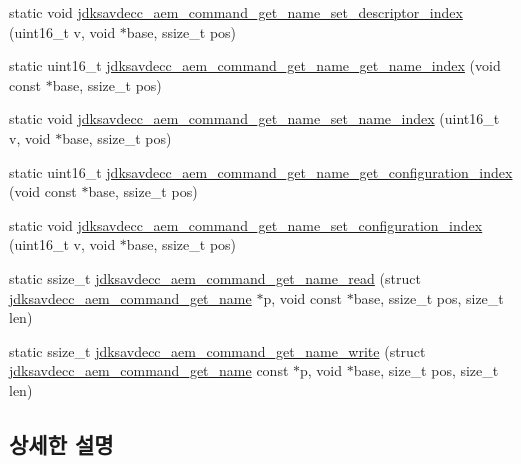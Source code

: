 \begin{DoxyCompactItemize}
\item 
static void \hyperlink{group__command__get__name_ga50c21d5e5e65361be4a6075540e4fab5}{jdksavdecc\+\_\+aem\+\_\+command\+\_\+get\+\_\+name\+\_\+set\+\_\+descriptor\+\_\+index} (uint16\+\_\+t v, void $\ast$base, ssize\+\_\+t pos)
\item 
static uint16\+\_\+t \hyperlink{group__command__get__name_ga85c12d58ce311b3944ac05a3949ac3ff}{jdksavdecc\+\_\+aem\+\_\+command\+\_\+get\+\_\+name\+\_\+get\+\_\+name\+\_\+index} (void const $\ast$base, ssize\+\_\+t pos)
\item 
static void \hyperlink{group__command__get__name_ga88cd11ff53744a1cef316a2bf9975ab1}{jdksavdecc\+\_\+aem\+\_\+command\+\_\+get\+\_\+name\+\_\+set\+\_\+name\+\_\+index} (uint16\+\_\+t v, void $\ast$base, ssize\+\_\+t pos)
\item 
static uint16\+\_\+t \hyperlink{group__command__get__name_ga9c3952ca18ccf16a029a5cbacb687263}{jdksavdecc\+\_\+aem\+\_\+command\+\_\+get\+\_\+name\+\_\+get\+\_\+configuration\+\_\+index} (void const $\ast$base, ssize\+\_\+t pos)
\item 
static void \hyperlink{group__command__get__name_gab89c9273046ceb4ccff130c3416e414f}{jdksavdecc\+\_\+aem\+\_\+command\+\_\+get\+\_\+name\+\_\+set\+\_\+configuration\+\_\+index} (uint16\+\_\+t v, void $\ast$base, ssize\+\_\+t pos)
\item 
static ssize\+\_\+t \hyperlink{group__command__get__name_ga8a2d9d70c358d74a988ce120f5e40f48}{jdksavdecc\+\_\+aem\+\_\+command\+\_\+get\+\_\+name\+\_\+read} (struct \hyperlink{structjdksavdecc__aem__command__get__name}{jdksavdecc\+\_\+aem\+\_\+command\+\_\+get\+\_\+name} $\ast$p, void const $\ast$base, ssize\+\_\+t pos, size\+\_\+t len)
\item 
static ssize\+\_\+t \hyperlink{group__command__get__name_ga61f178bb903a33dc13e23c5e55e2d89d}{jdksavdecc\+\_\+aem\+\_\+command\+\_\+get\+\_\+name\+\_\+write} (struct \hyperlink{structjdksavdecc__aem__command__get__name}{jdksavdecc\+\_\+aem\+\_\+command\+\_\+get\+\_\+name} const $\ast$p, void $\ast$base, size\+\_\+t pos, size\+\_\+t len)
\end{DoxyCompactItemize}


\subsection{상세한 설명}


